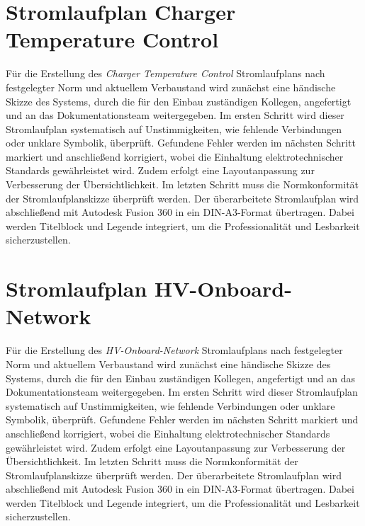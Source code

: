 \section*{Stromlaufplan Charger Temperature Control}
Für die Erstellung des \textit{Charger Temperature Control} Stromlaufplans nach festgelegter Norm und aktuellem Verbaustand wird zunächst eine händische Skizze des Systems, durch die für den Einbau zuständigen Kollegen, angefertigt und an das Dokumentationsteam weitergegeben. Im ersten Schritt wird dieser Stromlaufplan systematisch auf Unstimmigkeiten, wie fehlende Verbindungen oder unklare Symbolik, überprüft. Gefundene Fehler werden im nächsten Schritt markiert und anschließend korrigiert, wobei die Einhaltung elektrotechnischer Standards gewährleistet wird. Zudem erfolgt eine Layoutanpassung zur Verbesserung der Übersichtlichkeit. Im letzten Schritt muss die Normkonformität der Stromlaufplanskizze überprüft werden. Der überarbeitete Stromlaufplan wird abschließend mit Autodesk Fusion 360 in ein DIN-A3-Format übertragen. Dabei werden Titelblock und Legende integriert, um die Professionalität und Lesbarkeit sicherzustellen.

%
\addtocounter{page}{1} %

\section*{Stromlaufplan HV-Onboard-Network}
Für die Erstellung des \textit{HV-Onboard-Network} Stromlaufplans nach festgelegter Norm und aktuellem Verbaustand wird zunächst eine händische Skizze des Systems, durch die für den Einbau zuständigen Kollegen, angefertigt und an das Dokumentationsteam weitergegeben. Im ersten Schritt wird dieser Stromlaufplan systematisch auf Unstimmigkeiten, wie fehlende Verbindungen oder unklare Symbolik, überprüft. Gefundene Fehler werden im nächsten Schritt markiert und anschließend korrigiert, wobei die Einhaltung elektrotechnischer Standards gewährleistet wird. Zudem erfolgt eine Layoutanpassung zur Verbesserung der Übersichtlichkeit. Im letzten Schritt muss die Normkonformität der Stromlaufplanskizze überprüft werden. Der überarbeitete Stromlaufplan wird abschließend mit Autodesk Fusion 360 in ein DIN-A3-Format übertragen. Dabei werden Titelblock und Legende integriert, um die Professionalität und Lesbarkeit sicherzustellen.

